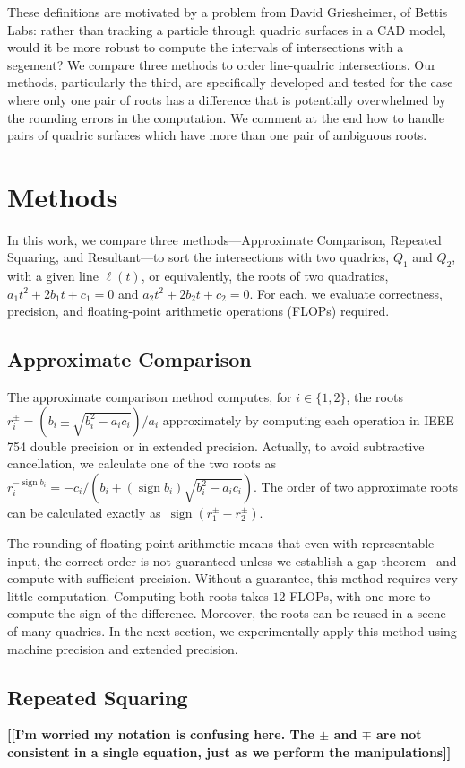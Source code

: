 \documentclass{cccg16}
\DeclareMathOperator{\sign}{sign}
\def\Michael#1{{\bf \color{red} [[#1]]}\ignorespaces}
\begin{document}
These definitions are motivated by a problem from David Griesheimer,
of Bettis Labs: rather than tracking a particle through quadric
surfaces in a CAD model, would it be more robust to compute the
intervals of intersections with a segement?  We compare three methods
to order line-quadric intersections.  Our methods, particularly the
third, are specifically developed and tested for the case where only
one pair of roots has a difference that is potentially overwhelmed by
the rounding errors in the computation. We comment at the end how to
handle pairs of quadric surfaces which have more than one pair of
ambiguous roots.

\section{Methods}
In this work, we compare three methods---Approximate Comparison,
Repeated Squaring, and Resultant---to sort the intersections with two
quadrics, $Q_1$ and $Q_2$, with a given line $\ell(t)$, or
equivalently, the roots of two quadratics, $a_1t^2+2b_1t+c_1=0$ and
$a_2t^2+2b_2t+c_2=0$.  For each, we evaluate correctness, precision,
and floating-point arithmetic operations (FLOPs) required.

\subsection{Approximate Comparison}
The approximate comparison method computes, for $i\in\{1, 2\}$, the
roots~$r_i^\pm=({b_i\pm\sqrt{b_i^2-a_ic_i}})/{a_i}$ approximately by
computing each operation in IEEE 754 double precision or in extended precision.  
Actually, to avoid subtractive cancellation, we calculate one of the two roots as 
$r_i^{-\sign b_i}=-c_i/({b_i+(\sign{b_i})\sqrt{b_i^2-a_ic_i}})$.
The order of two approximate roots can be
calculated exactly as~$\sign(r_1^\pm-r_2^\pm)$.

The rounding of floating point arithmetic means that even with representable input, the correct order is not guaranteed unless we establish a gap theorem~\cite{Canny,EMT} and compute with sufficient precision.   
Without a guarantee,  this method
requires very little computation.  Computing both roots takes
$12$ FLOPs, with one more to compute the sign of the difference.   
Moreover, the roots can be reused in a scene of many quadrics.  
In the next section, we experimentally apply this method using machine precision and extended precision.

\subsection{Repeated Squaring}
\Michael{I'm worried my notation is confusing here. The $\pm$ and
  $\mp$ are not consistent in a single equation, just as we perform
  the manipulations}
\end{document}
